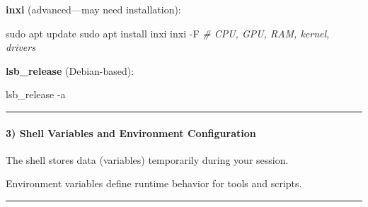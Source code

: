 \documentclass[
  english,
  paper=a4,
  oneside  ,captions=tableheading
]{scrartcl}
\newenvironment{Shaded}{}{}
\newcommand{\AttributeTok}[1]{\textcolor[rgb]{0.49,0.56,0.16}{#1}}
\newcommand{\BuiltInTok}[1]{\textcolor[rgb]{0.00,0.50,0.00}{#1}}
\newcommand{\CommentTok}[1]{\textcolor[rgb]{0.38,0.63,0.69}{\textit{#1}}}
\newcommand{\ExtensionTok}[1]{#1}
\newcommand{\FunctionTok}[1]{\textcolor[rgb]{0.02,0.16,0.49}{#1}}
\newcommand{\NormalTok}[1]{#1}
\newcommand{\OperatorTok}[1]{\textcolor[rgb]{0.40,0.40,0.40}{#1}}
\newcommand{\StringTok}[1]{\textcolor[rgb]{0.25,0.44,0.63}{#1}}
\newcommand{\VariableTok}[1]{\textcolor[rgb]{0.10,0.09,0.49}{#1}}
\begin{document}
\textbf{inxi} (advanced---may need installation):

\begin{Shaded}
\begin{Highlighting}[]
\FunctionTok{sudo}\NormalTok{ apt update}
\FunctionTok{sudo}\NormalTok{ apt install inxi}
\ExtensionTok{inxi} \AttributeTok{{-}F}         \CommentTok{\# CPU, GPU, RAM, kernel, drivers}
\end{Highlighting}
\end{Shaded}

\textbf{lsb\_release} (Debian-based):

\begin{Shaded}
\begin{Highlighting}[]
\ExtensionTok{lsb\_release} \AttributeTok{{-}a}
\end{Highlighting}
\end{Shaded}

\begin{center}\rule{0.5\linewidth}{0.5pt}\end{center}

\paragraph{3) Shell Variables and Environment
Configuration}\label{shell-variables-and-environment-configuration}

The shell stores data (variables) temporarily during your session.

\begin{Shaded}
\end{Shaded}

Environment variables define runtime behavior for tools and scripts.

\begin{center}\rule{0.5\linewidth}{0.5pt}\end{center}
\end{document}
